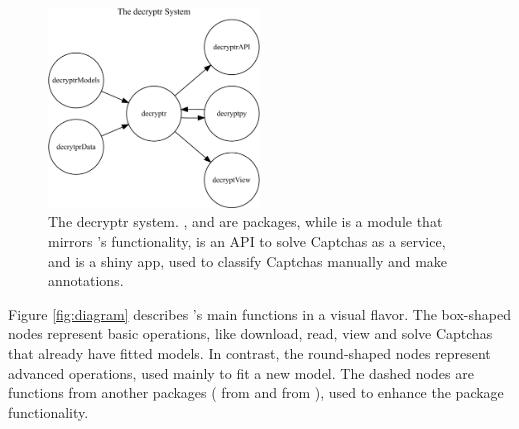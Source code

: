 \documentclass[article,nojss]{jss}
\begin{document}
\begin{CodeChunk}
\begin{figure}[H]

{\centering \includegraphics[width=0.5\textwidth]{decryptr_jss_files/figure-latex/decryptr-system-1} 

}

\caption[The decryptr system]{The decryptr system. ,  and  are  packages, while  is a  module that mirrors 's functionality,  is an API to solve Captchas as a service, and  is a shiny app, used to classify Captchas manually and make annotations.}\label{fig:decryptr-system}
\end{figure}
\end{CodeChunk}

Figure \ref{fig:diagram} describes 's main functions in a
visual flavor. The box-shaped nodes represent basic operations, like
download, read, view and solve Captchas that already have fitted models.
In contrast, the round-shaped nodes represent advanced operations, used
mainly to fit a new model. The dashed nodes are functions from another
packages ( from  and  from
), used to enhance the package functionality.
\end{document}

